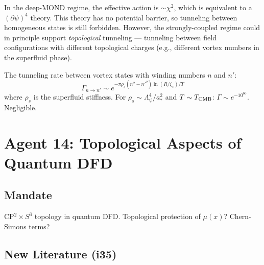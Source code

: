 \documentclass[11pt,a4paper]{article}
\begin{document}
In the deep-MOND regime, the effective action is $\sim \chi^2$, which is equivalent to a $(\partial\psi)^4$ theory. This theory has no potential barrier, so tunneling between homogeneous states is still forbidden. However, the strongly-coupled regime could in principle support \emph{topological} tunneling --- tunneling between field configurations with different topological charges (e.g., different vortex numbers in the superfluid phase).

The tunneling rate between vortex states with winding numbers $n$ and $n'$:
\begin{equation}
\Gamma_{n\to n'} \sim e^{-\pi\rho_s(n^2 - n'^2)\ln(R/\xi_v)/T}
\end{equation}
where $\rho_s$ is the superfluid stiffness. For $\rho_s \sim \Lambda_\psi^4/a_*^2$ and $T \sim T_{\rm CMB}$: $\Gamma \sim e^{-10^{60}}$. Negligible.

\newpage
\section{Agent 14: Topological Aspects of Quantum DFD}
\label{sec:agent14}

\subsection{Mandate}

CP$^2 \times S^3$ topology in quantum DFD. Topological protection of $\mu(x)$? Chern-Simons terms?

\subsection{New Literature (i35)}
\end{document}
